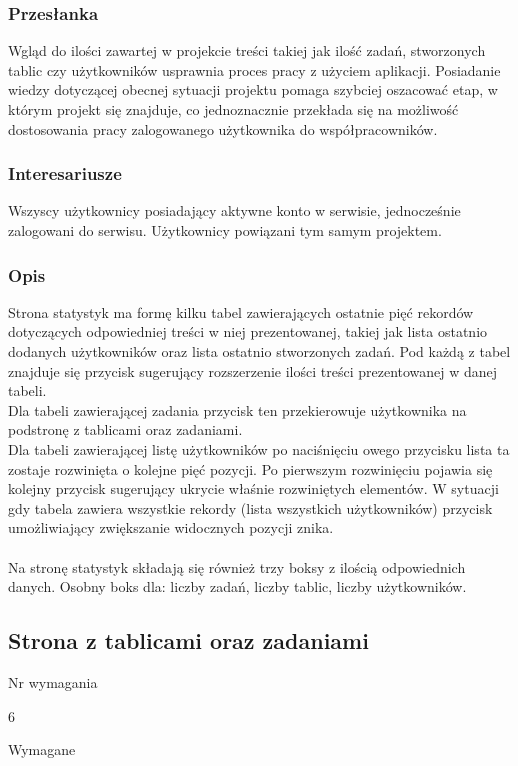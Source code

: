 \documentclass[eng,printmode]{mgr}
\begin{document}
\subsubsection{Przesłanka}
Wgląd do ilości zawartej w projekcie treści takiej jak ilość zadań, stworzonych tablic czy użytkowników  usprawnia proces pracy z użyciem aplikacji. Posiadanie wiedzy dotyczącej obecnej sytuacji projektu pomaga szybciej oszacować etap, w którym projekt się znajduje, co jednoznacznie przekłada się na możliwość dostosowania pracy zalogowanego użytkownika do współpracowników.

\subsubsection{Interesariusze}
Wszyscy użytkownicy posiadający aktywne konto w serwisie, jednocześnie zalogowani do serwisu. Użytkownicy powiązani tym samym projektem.

\subsubsection{Opis}
Strona statystyk ma formę kilku tabel zawierających ostatnie pięć rekordów dotyczących odpowiedniej treści w niej prezentowanej, takiej jak lista ostatnio dodanych użytkowników oraz lista ostatnio stworzonych zadań. Pod każdą z tabel znajduje się przycisk sugerujący rozszerzenie ilości treści prezentowanej w danej tabeli.
\\
Dla tabeli zawierającej zadania przycisk ten przekierowuje użytkownika na podstronę z tablicami oraz zadaniami.
\\
Dla tabeli zawierającej listę użytkowników po naciśnięciu owego przycisku lista ta zostaje rozwinięta o kolejne pięć pozycji. Po pierwszym rozwinięciu pojawia się kolejny przycisk sugerujący ukrycie właśnie rozwiniętych elementów. W sytuacji gdy tabela zawiera wszystkie rekordy (lista wszystkich użytkowników) przycisk umożliwiający zwiększanie widocznych pozycji znika.
\\ \\
Na stronę statystyk składają się również trzy boksy z ilością odpowiednich danych. Osobny boks dla: liczby zadań, liczby tablic, liczby użytkowników.

\subsection{Strona z tablicami oraz zadaniami}
\begin{labeling}{Nr wymagania}
\item [Nr wymagania:] 6
\item [Priorytet:] Wymagane
\end{labeling}
\end{document}
